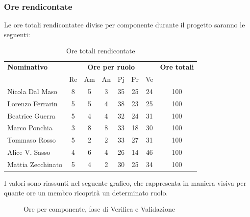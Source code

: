 \subsubsection{Ore rendicontate}
Le ore totali rendicontatee divise per componente durante il progetto saranno le seguenti:

\begin{table}[H]
	\centering
	\begin{tabular}{|l|c|c|c|c|c|c|c|}
		\hline
		\textbf{Nominativo} & 
		\multicolumn{6}{c|}{\textbf{Ore per ruolo}} & 
		\textbf{Ore totali} \\
		& Re & Am & An & Pj & Pr & Ve & \\
		\hline
		Nicola Dal Maso &8 &5 &3 &35 &25 &24 & 100 \\
		Lorenzo Ferrarin &5 &5 &4 &38 &23 &25 & 100 \\
		Beatrice Guerra &5 &4 &4 &32 &24 &31 & 100 \\
		Marco Ponchia &3 &8 &8 &33 &18 &30 & 100 \\
		Tommaso Rosso &5 &2 &2 &33 &27 &31 & 100 \\
		Alice V. Sasso &4 &6 &4 &26 &14 &46 & 100 \\
		Mattia Zecchinato &5 &4 &2 &30 &25 &34 & 100 \\
		\hline
	\end{tabular}
	\caption{Ore totali rendicontate}
\end{table}
I valori sono riassunti nel seguente grafico, che rappresenta in maniera visiva per quante ore un membro ricoprirà un determinato ruolo.
\begin{figure}[H]
	\centering
	\caption{Ore per componente, fase di Verifica e Validazione}
\end{figure}





